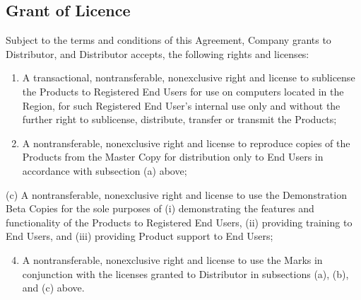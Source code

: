 \documentclass[letterpaper,10pt,openany,oneside,english]{sphinxmanual}
\begin{document}
\subsection{Grant of Licence}
\label{\detokenize{grantlicence:grant-of-licence}}
Subject to the terms and conditions of this Agreement, Company grants to Distributor, and Distributor accepts, the following rights and licenses:
\begin{enumerate}
\item {} 
A transactional, nontransferable, nonexclusive right and license to sublicense the Products to Registered End Users for use on computers located in the Region, for such Registered End User’s internal use only and without the further right to sublicense, distribute, transfer or transmit the Products;

\item {} 
A nontransferable, nonexclusive right and license to reproduce copies of the Products from the Master Copy for distribution only to End Users in accordance with subsection (a) above;

\end{enumerate}

(c)     A nontransferable, nonexclusive right and license to use the Demonstration Beta
Copies for the sole purposes of (i) demonstrating the features and functionality of the Products to Registered End Users, (ii) providing training to End Users, and (iii) providing Product support to
End Users;
\begin{enumerate}
\setcounter{enumi}{3}
\item {} 
A nontransferable, nonexclusive right and license to use the Marks in conjunction with the licenses granted to Distributor in subsections (a), (b), and (c) above.

\end{enumerate}
\end{document}
